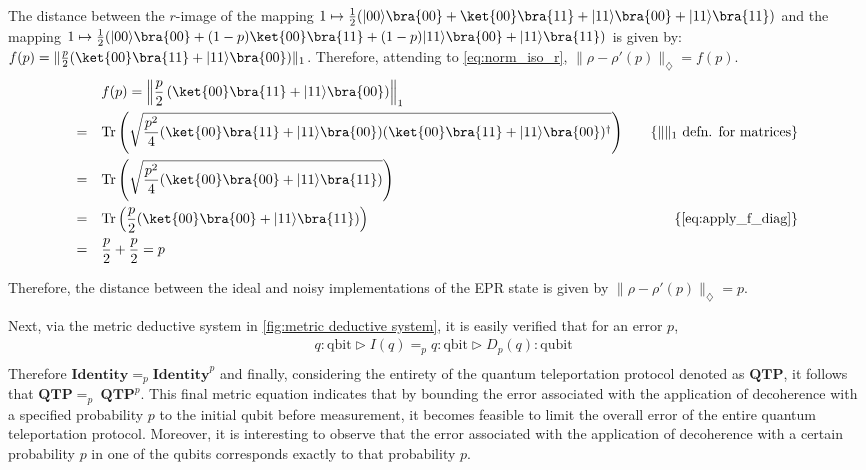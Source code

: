 The distance between the $r$-image of the mapping $1 \mapsto \frac{1}{2} (|00\rangle \bra{00} + \ket{00}\bra{11} + |11\rangle \bra{00} + |11\rangle \bra{11})$ and the mapping $1 \mapsto \frac{1}{2} (|00\rangle \bra{00} + (1-p) \ket{00}\bra{11} + (1-p) |11\rangle \bra{00} + |11\rangle \bra{11} )$ is given by: $f(p)= \lVert\frac{p}{2}(\ket{00}\bra{11}+|11\rangle \bra{00})\rVert_{1}$. Therefore, attending to \autoref{eq:norm_iso_r}, $\lVert \rho-\rho'(p) \rVert_{\diamondsuit} = f(p)$.
\begin{equation}
  \begin{split}
    \quad&f(p) = \left\lVert\frac{p}{2}\left(\ket{00}\bra{11}+|11\rangle \bra{00}\right)\right\rVert_{1} \\
   = \quad &  \text{Tr}\left(\sqrt{\frac{p^{2}}{4}(\ket{00}\bra{11}+|11\rangle \bra{00})(\ket{00}\bra{11}+|11\rangle \bra{00})^{\dag}}\right)  \quad & \{\lVert \rVert_{1} \text{ defn. for matrices}\} \\
   =  \quad &  \text{Tr} \left(\sqrt{ \frac{p^{2}}{4} (\ket{00}\bra{00}+|11\rangle \bra{11})} \right) & \\
    =  \quad &  \text{Tr} \left( \frac{p}{2}(\ket{00}\bra{00}+|11\rangle \bra{11}) \right) & \{ \text{\autoref{eq:apply_f_diag}}\} \\
    =  \quad &  \frac{p}{2} + \frac{p}{2} = p & \\
  \end{split}
\end{equation}

Therefore, the distance between the ideal and noisy implementations of the EPR state is given by $\lVert \rho-\rho'(p) \rVert_{\diamondsuit} = p$.

Next, via the metric deductive system in \autoref{fig:metric deductive system}, it is easily verified that for an error $p$,
\begin{equation}
\begin{split}
    &q: \text{qbit}  \triangleright  I (q) =_{p} q: \text{qbit} \triangleright D_{p} (q)  : \text{qubit} \\    
\end{split}
\end{equation}
Therefore $\textbf{Identity} =_{p} \textbf{Identity}^{p}$ and finally, considering the entirety of the quantum teleportation protocol denoted as $\textbf{QTP}$, it follows that $\textbf{QTP} =_{p} \hspace{3pt}\textbf{QTP}^{p}$. This final metric equation indicates that by bounding the error associated with the application of decoherence with a specified probability $p$ to the initial qubit before measurement, it becomes feasible to limit the overall error of the entire quantum teleportation protocol. Moreover, it is interesting to observe that the error associated with the application of decoherence with a certain probability $p$ in one of the qubits corresponds exactly to that probability $p$.

